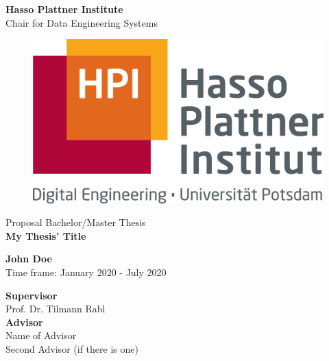 \documentclass[a4paper, titlepage, 12pt]{article}
\newcommand{\thesisTitle}{My Thesis' Title}
\newcommand{\name}{John Doe}
\newcommand{\timeFrame}{January 2020 - July 2020}
\newcommand{\supervisor}{Prof. Dr. Tilmann Rabl}
\newcommand{\advisor}{Name of Advisor\\Second Advisor (if there is one)}
\newcommand{\thesisType}{Bachelor/Master}
\begin{document}
\begin{titlepage}
\begin{center}
\LARGE{\textbf{Hasso Plattner Institute}}\\
\normalsize{Chair for Data Engineering Systems}\\[0.3cm]

\begin{figure}[h!]
    \centering
    \includegraphics[width=.3\linewidth]{images/hpi_logo.jpg}
\end{figure}
\vspace{1cm}

\LARGE{Proposal {\thesisType} Thesis}\\[0.7cm]
\Huge{\textbf{\thesisTitle}}

\vspace{1cm} 

\Large{\textbf{\name}} \\[3pt]  
\vspace{0.5cm}
\large{Time frame: \timeFrame} \\ 

\vspace{1cm}

\large{\textbf{Supervisor}}\\
\supervisor\\
\vspace{0.5cm}
\textbf{Advisor}\\
\advisor\\
\end{center}
\end{titlepage}







\clearpage

{\small 

}
\end{document}

